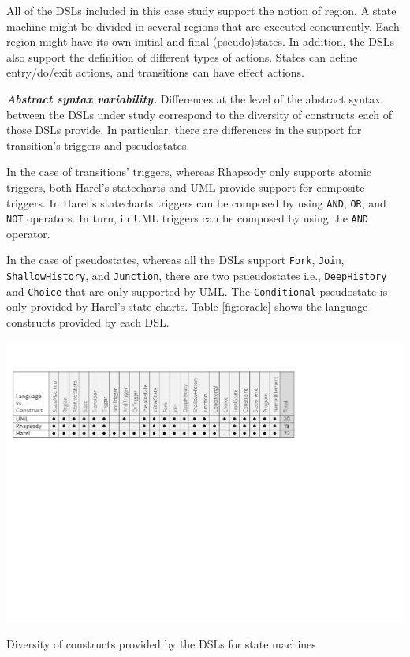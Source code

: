 \documentclass[preprint,5p]{elsarticle}
\begin{document}
All of the DSLs included in this case study support the notion of region. A state machine might be divided in several regions that are executed concurrently. Each region might have its own initial and final (pseudo)states. In addition, the DSLs also support the definition of different types of actions. States can define entry/do/exit actions, and transitions can have effect actions.

\vspace{2mm}
\textit{\textbf{Abstract syntax variability.}} Differences at the level of the abstract syntax between the DSLs under study correspond to the diversity of constructs each of those DSLs provide. In particular, there are differences in the support for transition's triggers and pseudostates.

In the case of transitions' triggers, whereas Rhapsody only supports atomic triggers, both Harel's statecharts and UML provide support for composite triggers. In Harel's statecharts triggers can be composed by using \texttt{AND}, \texttt{OR}, and \texttt{NOT} operators. In turn, in UML triggers can be composed by using the \texttt{AND} operator.

In the case of pseudostates, whereas all the DSLs support \texttt{Fork}, \texttt{Join}, \texttt{ShallowHistory}, and \texttt{Junction}, there are two psueudostates i.e., \texttt{DeepHistory} and \texttt{Choice} that are only supported by UML. The \texttt{Conditional} pseudostate is only provided by Harel's state charts. Table \ref{fig:oracle} shows the language constructs provided by each DSL.

\begin{table}[t]
	\centering
	\includegraphics[width=1\linewidth]{images/tab-oracle-statemachines}
	\caption{Diversity of constructs provided by the DSLs for state machines}
	\label{fig:oracle}
\end{table}
\end{document}
